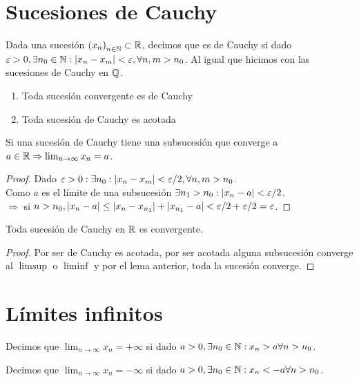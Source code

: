 \section{Sucesiones de Cauchy}

Dada una sucesión \({(x_n)}_{n \in \mathbb{N}} \subset \mathbb{R} \), decimos que es de Cauchy si dado \(\varepsilon > 0, \exists n_0 \in \mathbb{N} : |x_n - x_m| < \varepsilon, \forall n,m > n_0\). Al igual que hicimos con las sucesiones de Cauchy en \(\mathbb{Q} \).

\begin{enumerate}
  \item Toda sucesión convergente es de Cauchy
  \item Toda sucesión de Cauchy es acotada
\end{enumerate}

\begin{lemma}
  Si una sucesión de Cauchy tiene una subsucesión que converge a \(a \in \mathbb{R} \Rightarrow \lim_{n \to \infty} x_n = a\).
  \begin{proof}
    Dado \(\varepsilon > 0 : \exists n_0 : |x_n - x_m| < \varepsilon / 2, \forall n,m > n_0\). \\
    Como \(a\) es el límite de una subsucesión \(\exists n_1 > n_0 : |x_n - a| < \varepsilon / 2\). \\
    \(\Rightarrow \) si \(n > n_0, |x_n - a| \leq |x_n - x_{n_1}| + |x_{n_1} - a| < \varepsilon / 2 + \varepsilon / 2 = \varepsilon \).
  \end{proof}
\end{lemma}

\begin{theorem}
  Toda sucesión de Cauchy en \(\mathbb{R} \) es convergente.
  \begin{proof}
    Por ser de Cauchy es acotada, por ser acotada alguna subsucesión converge al \(\limsup\) o \(\liminf\) y por el lema anterior, toda la sucesión converge.
  \end{proof}
\end{theorem}

\section{Límites infinitos}

\begin{definition}
  Decimos que \(\lim_{n \to \infty} x_n = + \infty \) si dado \(a > 0, \exists n_0 \in \mathbb{N} : x_n > a \forall n > n_0\).
\end{definition}

\begin{definition}
  Decimos que \(\lim_{n \to \infty} x_n = - \infty \) si dado \(a > 0, \exists n_0 \in \mathbb{N} : x_n < -a \forall n > n_0\).
\end{definition}

